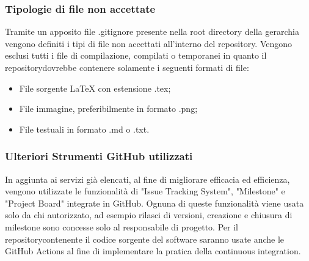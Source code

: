 	\subsubsection{Tipologie di file non accettate}
		Tramite un apposito file .gitignore presente nella root directory della gerarchia vengono definiti i tipi di file non accettati all'interno del repository\glo. Vengono esclusi tutti i file di compilazione, compilati o temporanei in quanto il repository\glosp dovrebbe contenere solamente i seguenti formati di file:
		\begin{itemize}
			\item File sorgente \LaTeX \xspace con estensione .tex;
			\item File immagine, preferibilmente in formato .png;
			\item File testuali in formato .md o .txt.			
		\end{itemize}
	
	\subsubsection{Ulteriori Strumenti GitHub utilizzati}
		In aggiunta ai servizi già elencati, al fine di migliorare efficacia ed efficienza, vengono utilizzate le funzionalità di "Issue Tracking System",
		"Milestone" e "Project Board" integrate in GitHub. Ognuna di queste funzionalità viene usata solo da chi autorizzato, ad esempio rilasci di versioni, creazione e chiusura di milestone sono concesse solo al responsabile di progetto\glo.
		\newline
		Per il repository\glosp contenente il codice sorgente del software saranno usate anche le GitHub Actions al fine di implementare la pratica della continuous integration.
		